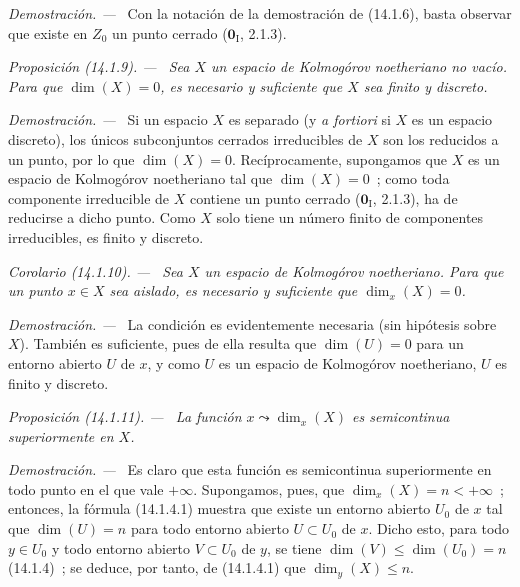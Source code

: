 \documentclass[10pt,oneside]{book}
\makeatletter
\newcommand{\setmanualcurrentlabel}[1]{\def\@currentlabel{#1}}
\newcommand{\oldpage}[2][]{%
  \setcounter{footnote}{0}%
  \marginpar{\scriptsize\textbf{#1}~|~#2}\ignorespaces}
\newenvironment{proposition}[1][]{%
  \setmanualcurrentlabel{#1}\par\medskip\noindent\itshape Proposición (#1). ---\ }{\par}
\newenvironment{corollary}[1][]{%
  \setmanualcurrentlabel{#1}\par\medskip\noindent\itshape Corolario (#1). ---\ }{\par}
\newenvironment{proof}{%
  \par\medskip\noindent\textit{Demostración. ---\ }}{\par}
\makeatother
\begin{document}
\begin{proof}
Con la notación de la demostración de (14.1.6), basta observar
que existe en $Z_0$ un punto cerrado ($\mathbf{0}_{\mathrm I}$, 2.1.3).
\end{proof}

\begin{proposition}[14.1.9]
\label{0.14.1.9-es}
Sea $X$ un espacio de Kolmogórov noetheriano no vacío. Para que
$\dim(X)=0$, es necesario y suficiente que $X$ sea finito y discreto.
\end{proposition}

\begin{proof}
Si un espacio $X$ es separado (y \emph{a fortiori} si $X$ es un espacio
discreto), los únicos subconjuntos cerrados irreducibles de $X$ son los
reducidos a un punto, por lo que $\dim(X)=0$. Recíprocamente, supongamos que
$X$ es un espacio de Kolmogórov noetheriano tal que $\dim(X)=0$~; como toda
componente irreducible de $X$ contiene un punto cerrado ($\mathbf{0}_{\mathrm I}$, 2.1.3),
ha de reducirse a dicho punto. Como $X$ solo tiene un número finito de
componentes irreducibles, es finito y discreto.
\end{proof}

\begin{corollary}[14.1.10]
\label{0.14.1.10-es}
Sea $X$ un espacio de Kolmogórov noetheriano. Para que un punto $x\in X$ sea
aislado, es necesario y suficiente que $\dim_x(X)=0$.
\end{corollary}

\begin{proof}
La condición es evidentemente necesaria (sin hipótesis sobre $X$). También es
suficiente,
\oldpage[0\textsubscript{IV-1}]{8}
pues de ella resulta que $\dim(U)=0$ para un entorno abierto $U$ de $x$, y
como $U$ es un espacio de Kolmogórov noetheriano, $U$ es finito y discreto.
\end{proof}

\begin{proposition}[14.1.11]
\label{0.14.1.11-es}
La función $x\leadsto\dim_x(X)$ es semicontinua superiormente en $X$.
\end{proposition}

\begin{proof}
Es claro que esta función es semicontinua superiormente en todo
punto en el que vale $+\infty$. Supongamos, pues, que $\dim_x(X)=n<+\infty$~;
entonces, la fórmula (14.1.4.1) muestra que existe un entorno abierto $U_0$ de
$x$ tal que $\dim(U)=n$ para todo entorno abierto $U\subset U_0$ de $x$.
Dicho esto, para todo $y\in U_0$ y todo entorno abierto $V\subset U_0$ de $y$,
se tiene $\dim(V)\leq\dim(U_0)=n$ (14.1.4)~; se deduce, por tanto, de
(14.1.4.1) que $\dim_y(X)\leq n$.
\end{proof}
\end{document}
